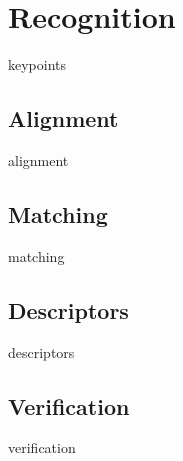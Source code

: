 
\chapter{Recognition}
\label{cha:keypoints}

keypoints


\section{Alignment}
\label{sec:alignment}

alignment


\section{Matching}
\label{sec:matching}

matching


\section{Descriptors}
\label{sec:descriptors}

descriptors


\section{Verification}
\label{sec:verification}

verification